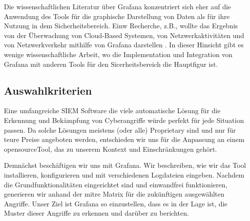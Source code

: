 Die wissenschaftlichen Literatur über Grafana konzentriert sich eher auf die Anwendung des Tools für die graphische Darstellung von Daten als für ihre Nutzung in dem Sicherheitsbereich. Einw Recherche, z.B., wollte das Ergebnis von der Überwachung von Cloud-Based Systemen, von Netzwerkaktivitäten und von Netzwerkverkehr mithilfe von Grafana darstellen \citep{Manases_grafananetwork}. In dieser Hinsicht gibt es wenige wissenschaftliche Arbeit, wo die Implementation und Integration von Grafana mit anderen Tools für den Sicerheitsbereich die Hauptfigur ist.

\subsection{Auswahlkriterien}
Eine umfangreiche \gls{SIEM} Software die viele automatische Lösung für die Erkennung und Bekämpfung von Cyberangriffe würde perfekt für jede Situation passen. Da solche Lösungen meistens (oder alle) \gls{Proprietary} sind und nur für teure Preise angeboten werden, entschieden wir uns für die Anpassung an einem \gls{opensource}Tool, das zu unserem Kontext und Einschränkungen gehört. 

Demnächst beschäftigen wir uns mit Grafana. Wir beschreiben, wie wir das Tool installieren, konfigurieren und mit verschiedenen Logdateien eingeben. Nachdem die Grundfunktionalitäten eingerichtet sind und einwandfrei funktionieren, generieren wir anhand der \gls{mitre} Matrix  für die zukünftigen ausgewählten Angriffe. Unser Ziel ist Grafana so einzustellen, dass es in der Lage ist, die Muster dieser Angriffe zu erkennen und darüber zu berichten.
